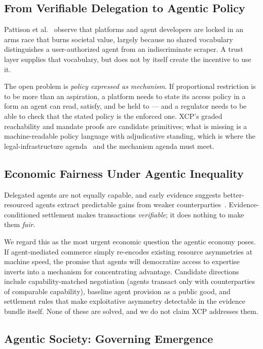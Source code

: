 \documentclass[11pt]{article}
\begin{document}
\subsection{From Verifiable Delegation to Agentic Policy}

Pattison et al.~\cite{pattison2026} observe that platforms and agent developers
are locked in an arms race that burns societal value, largely because no shared
vocabulary distinguishes a user-authorized agent from an indiscriminate scraper.
A trust layer supplies that vocabulary, but does not by itself create the
incentive to use it.

The open problem is \emph{policy expressed as mechanism}. If proportional
restriction is to be more than an aspiration, a platform needs to state its
access policy in a form an agent can read, satisfy, and be held to --- and a
regulator needs to be able to check that the stated policy is the enforced one.
XCP's graded reachability and mandate proofs are candidate primitives; what is
missing is a machine-readable policy language with adjudicative standing, which
is where the legal-infrastructure agenda~\cite{chaffer2026} and the mechanism
agenda must meet.

\subsection{Economic Fairness Under Agentic Inequality}

Delegated agents are not equally capable, and early evidence suggests
better-resourced agents extract predictable gains from weaker
counterparties~\cite{pattison2026}. Evidence-conditioned settlement makes
transactions \emph{verifiable}; it does nothing to make them \emph{fair}.

We regard this as the most urgent economic question the agentic economy poses.
If agent-mediated commerce simply re-encodes existing resource asymmetries at
machine speed, the promise that agents will democratize access to expertise
inverts into a mechanism for concentrating advantage. Candidate directions
include capability-matched negotiation (agents transact only with counterparties
of comparable capability), baseline agent provision as a public good, and
settlement rules that make exploitative asymmetry detectable in the evidence
bundle itself. None of these are solved, and we do not claim XCP addresses them.

\subsection{Agentic Society: Governing Emergence}
\end{document}
